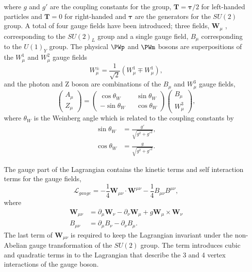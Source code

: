where $g$ and $g\prime$ are the coupling constants for the group,
$\mathbf{T}=\mathbf{\tau}/2$ for left-handed particles and 
$\mathbf{T}=0$ for right-handed and $\mathbf{\tau}$
are the generators for the $SU(2)$ group. A total of four gauge fields have been
introduced; three fields, $\mathbf{W}_{\mu}$ , corresponding to the $SU(2)_{L}$
group and a single gauge field, $B_{\mu}$ corresponding to the $U(1)_{Y}$ group.
The physical $\PWp$ and $\PWm$ bosons are superpositions of the $W^{1}_{\mu}$
and $W^{2}_{\mu}$ gauge fields
\begin{equation}
W^{\pm}_{\mu} = \frac{1}{\sqrt{2}} \left(W^{1}_{\mu} \mp W^{1}_{\mu}\right),
\label{eq:wgauge}
\end{equation}
and the photon and Z boson are combinations of the $B_{\mu}$ and $W^{3}_{\mu}$
gauge fields,
\begin{equation}
\left( \begin{matrix} A_{\mu}\\ Z_{\mu}\end{matrix}\right) =
\left( \begin{matrix} \cos\theta_{W} && \sin\theta_{W} \\  
                      -\sin\theta_{W} && \cos\theta_{W} \end{matrix}\right) 
\left( \begin{matrix} B_{\mu}\\ W^{3}_{\mu}\end{matrix}\right) ,
\label{eq:bgauge}
\end{equation}
where $\theta_{W}$ is the Weinberg angle which is related to the coupling
constants by
\begin{align*}
\sin\theta_{W} &= \frac{g\prime}{\sqrt{g^{2}+g\prime^{2}}},\\
\cos\theta_{W} &= \frac{g}{\sqrt{g^{2}+g\prime^{2}}}.
\end{align*}

The gauge part of the Lagrangian contains the kinetic terms and self interaction
terms for the gauge fields,
\begin{equation}
\mathcal{L}_{gauge} = 
- \frac{1}{4} \mathbf{W}_{\mu\nu} \cdot \mathbf{W}^{\mu\nu}
- \frac{1}{4} B_{\mu\nu} B^{\mu\nu},
\end{equation}
where
\begin{align*}
\mathbf{W}_{\mu\nu} &=
\partial_{\mu} \mathbf{W}_{\nu} -
\partial_{\nu} \mathbf{W}_{\mu} +
g \mathbf{W}_{\mu} \times \mathbf{W}_{\nu}\\
B_{\mu\nu} &= 
\partial_{\mu} B_{\nu}-
\partial_{\nu} B_{\mu}.
\end{align*}
The last term of $\mathbf{W}_{\mu\nu}$ is required to keep the Lagrangian invariant
under the non-Abelian gauge transformation of the $SU(2)$ group. The term
introduces cubic and quadratic terms in to the Lagrangian that describe the 3 and 4
vertex interactions of the gauge boson.

